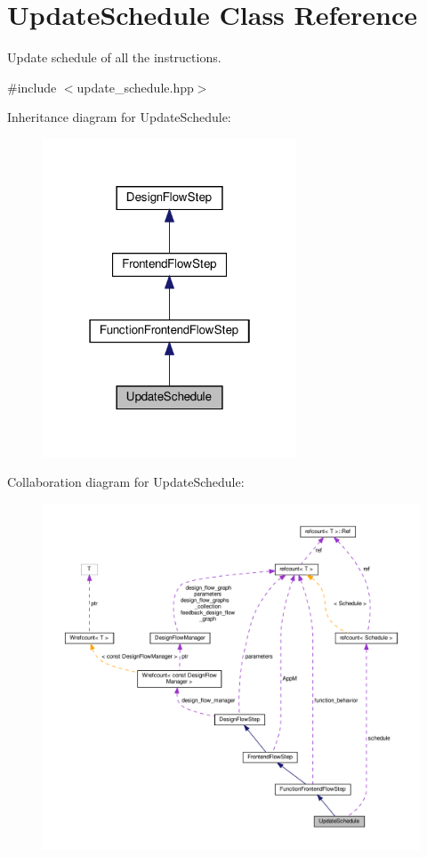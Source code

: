 \hypertarget{classUpdateSchedule}{}\section{Update\+Schedule Class Reference}
\label{classUpdateSchedule}


Update schedule of all the instructions.  




{\ttfamily \#include $<$update\+\_\+schedule.\+hpp$>$}



Inheritance diagram for Update\+Schedule\+:
\nopagebreak
\begin{figure}[H]
\begin{center}
\leavevmode
\includegraphics[width=214pt]{dd/d92/classUpdateSchedule__inherit__graph}
\end{center}
\end{figure}


Collaboration diagram for Update\+Schedule\+:
\nopagebreak
\begin{figure}[H]
\begin{center}
\leavevmode
\includegraphics[width=350pt]{db/d0f/classUpdateSchedule__coll__graph}
\end{center}
\end{figure}
